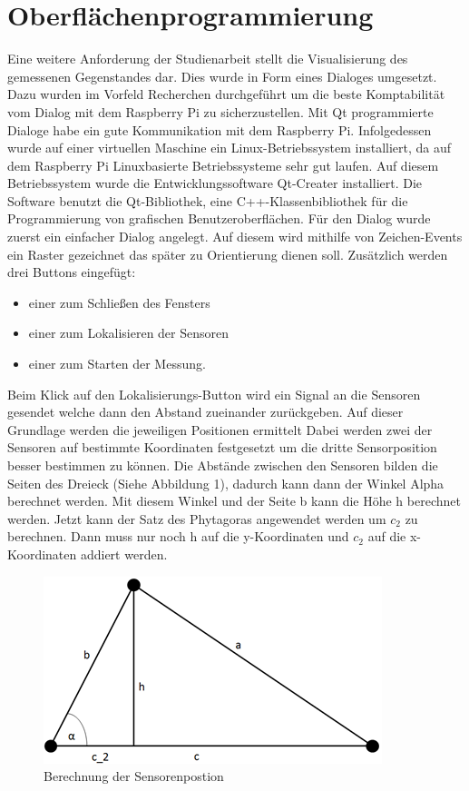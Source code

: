 

\chapter{Oberflächenprogrammierung}
Eine weitere Anforderung der Studienarbeit stellt die Visualisierung des gemessenen Gegenstandes dar. Dies wurde in Form eines Dialoges umgesetzt. Dazu wurden im Vorfeld Recherchen durchgeführt um die beste Komptabilität vom Dialog mit dem Raspberry Pi zu sicherzustellen. Mit Qt programmierte Dialoge habe ein gute Kommunikation mit dem Raspberry Pi. Infolgedessen wurde auf einer virtuellen Maschine ein Linux-Betriebssystem installiert, da auf dem Raspberry Pi Linuxbasierte Betriebssysteme sehr gut laufen. Auf diesem Betriebssystem wurde die Entwicklungssoftware Qt-Creater installiert. Die Software benutzt die Qt-Bibliothek, eine C++-Klassenbibliothek für die Programmierung von grafischen Benutzeroberflächen. 
Für den Dialog wurde zuerst ein einfacher Dialog angelegt. Auf diesem wird mithilfe von Zeichen-Events ein Raster gezeichnet das später zu Orientierung dienen soll. Zusätzlich werden drei Buttons eingefügt:
\begin{itemize}
	\item einer zum Schließen des Fensters
	\item einer zum Lokalisieren der Sensoren
	\item einer zum Starten der Messung.
\end{itemize}
Beim Klick auf den Lokalisierungs-Button wird ein Signal an die Sensoren gesendet welche dann den Abstand zueinander zurückgeben. Auf dieser Grundlage werden die jeweiligen Positionen ermittelt Dabei werden zwei der Sensoren auf bestimmte Koordinaten festgesetzt um die dritte Sensorposition besser bestimmen zu können. Die Abstände zwischen den Sensoren bilden die Seiten des Dreieck (Siehe Abbildung 1), dadurch kann dann der Winkel Alpha berechnet werden. Mit diesem Winkel und der Seite b kann die Höhe h berechnet werden. Jetzt kann der Satz des Phytagoras angewendet werden um $c_2$ zu berechnen. Dann muss nur noch h auf die y-Koordinaten und $c_2$ auf die x-Koordinaten addiert werden.
\begin{figure}
	\centering
	\includegraphics[scale=1]{images/gui/01.png}
	\caption{Berechnung der Sensorenpostion} \label{img:gui1}
\end{figure}

